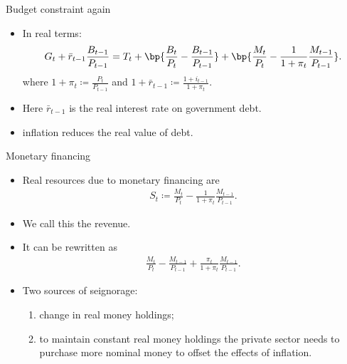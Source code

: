 \documentclass[11pt,xcolor={dvipsnames},aspectratio=159,hyperref={pdftex,pdfpagemode=UseNone,hidelinks,pdfdisplaydoctitle=true},usepdftitle=false]{beamer}
\begin{document}
\begin{frame}{Budget constraint again}
    \begin{itemize}
    \item In real terms:  \begin{align*}
         G_t + \bar{r}_{t-1} \frac{B_{t-1}}{P_{t-1}} = T_t + \bp{\frac{B_t}{P_t}-\frac{B_{t-1}}{P_{t-1}}} + \bp{\frac{M_t}{P_t} - \frac{1}{1+\pi_t} \frac{M_{t-1}}{P_{t-1}}}.
    \end{align*} where $1+\pi_t \coloneq \frac{P_t}{P_{t-1}}$ and $1+\bar{r}_{t-1} \coloneq \frac{1+i_{t-1}}{1+\pi_t}$.
    \item Here $\bar{r}_{t-1}$ is the  real interest rate on government debt.
    \item {} inflation reduces the real value of debt.
    \end{itemize}
\end{frame}

\begin{frame}{Monetary financing}
    \begin{itemize}
    \item Real resources due to monetary financing are \begin{align*}
        S_t \coloneq \frac{M_t}{P_t} - \frac{1}{1+\pi_t} \frac{M_{t-1}}{P_{t-1}}.
    \end{align*}
    \item We call this the  revenue.
    \item It can be rewritten as \begin{align*}
        \frac{M_t}{P_t} - \frac{M_{t-1}}{P_{t-1}} + \frac{\pi_t}{1+\pi_t} \frac{M_{t-1}}{P_{t-1}}. 
    \end{align*}
    \item Two sources of seignorage:
    \begin{enumerate}
        \item change in real money holdings;
        \item to maintain constant real money holdings the private sector needs to purchase more nominal money to offset the effects of inflation.
    \end{enumerate}
    \end{itemize}
\end{frame}
\end{document}
